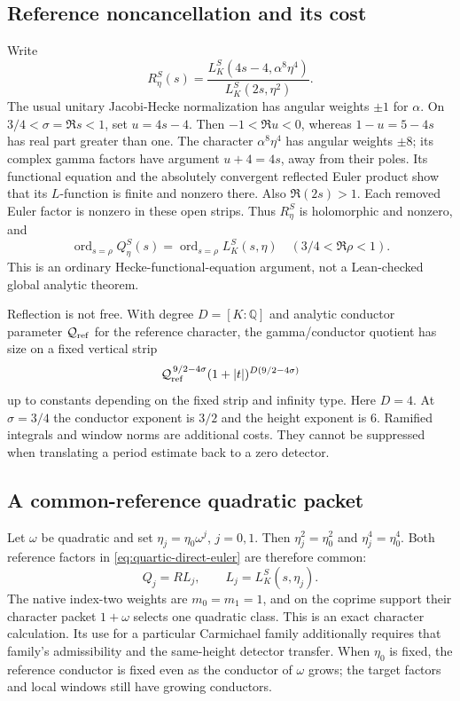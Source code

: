 \documentclass[11pt]{article}
\begin{document}
\subsection{Reference noncancellation and its cost}
Write
\[
 R_\eta^S(s)=
 \frac{L_K^S(4s-4,\alpha^8\eta^4)}{L_K^S(2s,\eta^2)} .
\]
The usual unitary Jacobi-Hecke normalization has angular weights
$\pm1$ for $\alpha$. On $3/4<\sigma=\Re s<1$, set $u=4s-4$.
Then $-1<\Re u<0$, whereas $1-u=5-4s$ has real part greater
than one. The character $\alpha^8\eta^4$ has angular weights
$\pm8$; its complex gamma factors have argument $u+4=4s$,
away from their poles. Its functional equation and the absolutely
convergent reflected Euler product show that its $L$-function is
finite and nonzero there. Also $\Re(2s)>1$.
Each removed Euler factor is nonzero in these open strips.
Thus $R_\eta^S$ is holomorphic and nonzero, and
\[
 \operatorname{ord}_{s=\rho}Q_\eta^S(s)
 =\operatorname{ord}_{s=\rho}L_K^S(s,\eta)
 \quad(3/4<\Re\rho<1).
\]
This is an ordinary Hecke-functional-equation argument, not a
Lean-checked global analytic theorem.

Reflection is not free. With degree $D=[K:\mathbb Q]$ and analytic
conductor parameter $\mathcal Q_{\rm ref}$ for the reference character,
the gamma/conductor quotient has size on a fixed vertical strip
\[
 \mathcal Q_{\rm ref}^{\,9/2-4\sigma}
 (1+|t|)^{D(9/2-4\sigma)}
\]
up to constants depending on the fixed strip and infinity type.
Here $D=4$. At $\sigma=3/4$ the conductor exponent is $3/2$
and the height exponent is $6$. Ramified integrals and window norms
are additional costs. They cannot be suppressed when translating a
period estimate back to a zero detector.

\subsection{A common-reference quadratic packet}
Let $\omega$ be quadratic and set $\eta_j=\eta_0\omega^j$, $j=0,1$.
Then $\eta_j^2=\eta_0^2$ and $\eta_j^4=\eta_0^4$. Both reference
factors in \eqref{eq:quartic-direct-euler} are therefore common:
\[
 Q_j=R L_j,\qquad L_j=L_K^S(s,\eta_j).
\]
The native index-two weights are $m_0=m_1=1$, and on the coprime
support their character packet $1+\omega$ selects one quadratic class.
This is an exact character calculation. Its use for a particular
Carmichael family additionally requires that family's admissibility
and the same-height detector transfer. When $\eta_0$ is fixed, the
reference conductor is fixed even as the conductor of $\omega$ grows;
the target factors and local windows still have growing conductors.
\end{document}
